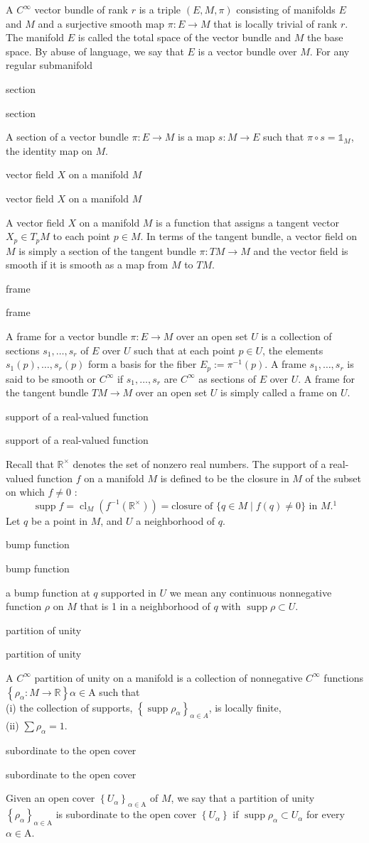 \documentclass[17pt]{extarticle}
\newcommand{\boxset}[2]{\begin{mdframed}[style=darkQuesion]
#1
\end{mdframed}
\newpage
\begin{mdframed}[style=darkQuesion]
  #1
    \end{mdframed}
\begin{mdframed}[style=darkAnswer]
  #2
    \end{mdframed}
    \newpage
}
\begin{document}
{A $C^{\infty}$ vector bundle of rank $r$ is a triple $(E, M, \pi)$ consisting of manifolds $E$ and $M$ and a surjective smooth map $\pi: E \rightarrow M$ that is locally trivial of rank $r$. The manifold $E$ is called the total space of the vector bundle and $M$ the base space. By abuse of language, we say that $E$ is a vector bundle over $M$. For any regular submanifold}
\boxset{section }
{A section of a vector bundle $\pi: E \rightarrow M$ is a map $s: M \rightarrow E$ such that $\pi \circ s=\mathbb{1}_{M}$, the identity map on $M$.}
\boxset{vector field $X$ on a manifold $M$ }
{A vector field $X$ on a manifold $M$ is a function that assigns a tangent vector $X_{p} \in T_{p} M$ to each point $p \in M$. In terms of the tangent bundle, a vector field on $M$ is simply a section of the tangent bundle $\pi: T M \rightarrow M$ and the vector field is smooth if it is smooth as a map from $M$ to $T M$.}
\boxset{frame }
{A frame for a vector bundle $\pi: E \rightarrow M$ over an open set $U$ is a collection of sections $s_{1}, \ldots, s_{r}$ of $E$ over $U$ such that at each point $p \in U$, the elements $s_{1}(p), \ldots, s_{r}(p)$ form a basis for the fiber $E_{p}:=\pi^{-1}(p)$. A frame $s_{1}, \ldots, s_{r}$ is said to be smooth or $C^{\infty}$ if $s_{1}, \ldots, s_{r}$ are $C^{\infty}$ as sections of $E$ over $U$. A frame for the tangent bundle $T M \rightarrow M$ over an open set $U$ is simply called a frame on $U$.}
\boxset{support of a real-valued function }
{Recall that $\mathbb{R}^{\times}$ denotes the set of nonzero real numbers. The support of a real-valued function $f$ on a manifold $M$ is defined to be the closure in $M$ of the subset on which $f \neq 0$ : \[\operatorname{supp} f=\operatorname{cl}_{M}\left(f^{-1}\left(\mathbb{R}^{\times}\right)\right)=\text {closure of }\{q \in M \mid f(q) \neq 0\} \text { in } M .{ }^{1}\] Let $q$ be a point in $M$, and $U$ a neighborhood of $q$. }
\boxset{bump function  }
{a bump function at $q$ supported in $U$ we mean any continuous nonnegative function $\rho$ on $M$ that is 1 in a neighborhood of $q$ with $\operatorname{supp} \rho \subset U$.}
\boxset{partition of unity }
{A $C^{\infty}$ partition of unity on a manifold is a collection of nonnegative $C^{\infty}$ functions $\left\{\rho_{\alpha}: M \rightarrow \mathbb{R}\right\} \alpha \in \mathrm{A}$ such that\[\ \] (i) the collection of supports, $\left\{\operatorname{supp} \rho_{\alpha}\right\}_{\alpha \in A}$, is locally finite,\[\ \] (ii) $\sum \rho_{\alpha}=1$.}
\boxset{subordinate to the open cover }
{Given an open cover $\left\{U_{\alpha}\right\}_{\alpha \in \mathrm{A}}$ of $M$, we say that a partition of unity $\left\{\rho_{\alpha}\right\}_{\alpha \in \mathrm{A}}$ is subordinate to the open cover $\left\{U_{\alpha}\right\}$ if $\operatorname{supp} \rho_{\alpha} \subset U_{\alpha}$ for every $\alpha \in \mathrm{A}$.}
\end{document}
